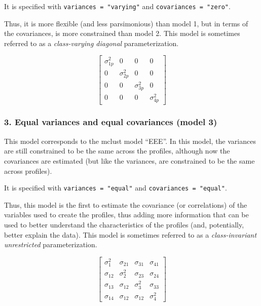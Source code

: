 \documentclass[man]{apa6}
\begin{document}
It is specified with \texttt{variances\ =\ "varying"} and \texttt{covariances\ =\ "zero"}.

Thus, it is more flexible (and less parsimonious) than model 1, but in terms of the covariances, is more constrained than model 2. This model is sometimes referred to as a \emph{class-varying diagonal} parameterization.

\[ 
\left[ \begin{matrix} { \sigma  }_{ 1p }^{ 2 } & 0 & 0 & 0 \\ 0 & { \sigma  }_{ 2p }^{ 2 } & 0 & 0 \\ 0 & 0 & { \sigma  }_{ 3p }^{ 2 } & 0 \\ 0 & 0 & 0 & { \sigma  }_{ 4p }^{ 2 } \end{matrix} \right] 
\]

\hypertarget{equal-variances-and-equal-covariances-model-3}{%
\subsubsection{3. Equal variances and equal covariances (model 3)}\label{equal-variances-and-equal-covariances-model-3}}

This model corresponds to the mclust model \enquote{EEE}. In this model, the variances are still constrained to be the same across the profiles, although now the covariances are estimated (but like the variances, are constrained to be the same across profiles).

It is specified with \texttt{variances\ =\ "equal"} and \texttt{covariances\ =\ "equal"}.

Thus, this model is the first to estimate the covariance (or correlations) of the variables used to create the profiles, thus adding more information that can be used to better understand the characteristics of the profiles (and, potentially, better explain the data). This model is sometimes referred to as a \emph{class-invariant unrestricted} parameterization.

\[
\left[ \begin{matrix} { \sigma  }_{ 1 }^{ 2 } & { \sigma  }_{ 21 } & { \sigma  }_{ 31 } & { \sigma  }_{ 41 } \\ { \sigma  }_{ 12 } & { \sigma  }_{ 2 }^{ 2 } & { \sigma  }_{ 23 } & { \sigma  }_{ 24 } \\ { \sigma  }_{ 13 } & { \sigma  }_{ 12 } & { \sigma  }_{ 3 }^{ 2 } & { \sigma  }_{ 33 } \\ { \sigma  }_{ 14 } & { \sigma  }_{ 12 } & { \sigma  }_{ 12 } & { \sigma  }_{ 4 }^{ 2 } \end{matrix} \right] 
\]
\end{document}
